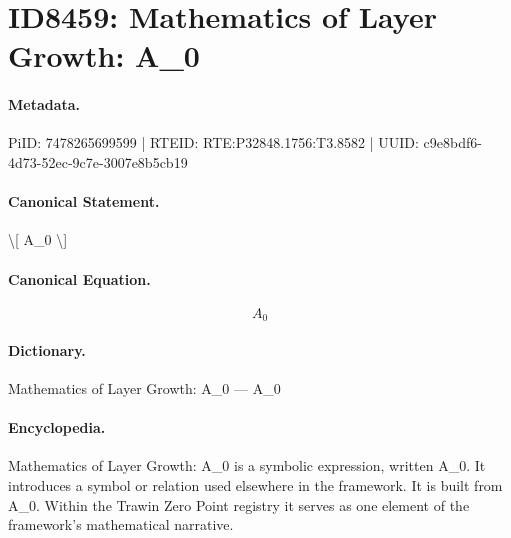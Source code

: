 \section*{ID8459: Mathematics of Layer Growth: A\_0}
\paragraph{Metadata.}
PiID: 7478265699599 | RTEID: RTE:P32848.1756:T3.8582 | UUID: c9e8bdf6-4d73-52ec-9c7e-3007e8b5cb19

\paragraph{Canonical Statement.}
\textbackslash{}[ A\_0 \textbackslash{}]

\paragraph{Canonical Equation.}
\[
A_0
\]

\paragraph{Dictionary.}
Mathematics of Layer Growth: A\_0 — A\_0

\paragraph{Encyclopedia.}
Mathematics of Layer Growth: A\_0 is a symbolic expression, written A\_0. It introduces a symbol or relation used elsewhere in the framework. It is built from A\_0. Within the Trawin Zero Point registry it serves as one element of the framework's mathematical narrative.
